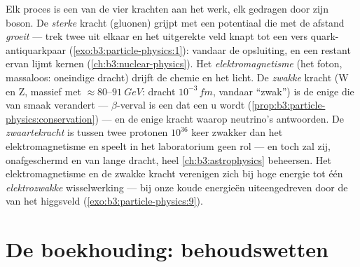 \begin{remark}\label{rem:b3:particle-physics:forces}
Elk proces is een van de vier krachten aan het werk, elk gedragen door zijn
boson. De \emph{sterke} kracht (gluonen) grijpt  met een
potentiaal die met de afstand \emph{groeit} --- trek twee 
uit elkaar en het uitgerekte veld knapt tot een vers
quark-antiquarkpaar (\cref{exo:b3:particle-physics:1}): vandaar
de opsluiting, en een restant ervan lijmt kernen
(\cref{ch:b3:nuclear-physics}). Het \emph{elektromagnetisme} (het foton,
massaloos: oneindige dracht) drijft de chemie en het licht. De
\emph{zwakke} kracht (W en Z, massief met
$\approx80$--$\qty{91}{GeV}$: dracht $10^{-3}\,\unit{fm}$,
vandaar ``zwak'') is de enige die van smaak verandert --- $\beta$-verval is
een  dat een u wordt
(\cref{prop:b3:particle-physics:conservation}) --- en de enige
kracht waarop neutrino's antwoorden. De \emph{zwaartekracht} is tussen twee protonen
$10^{36}$ keer zwakker dan het elektromagnetisme en speelt in het laboratorium
geen rol --- en toch zal zij, onafgeschermd en van lange dracht,
heel \cref{ch:b3:astrophysics} beheersen. Het elektromagnetisme en de zwakke
kracht verenigen zich bij hoge energie tot één \emph{elektrozwakke}
wisselwerking --- bij onze koude energieën uiteengedreven door de
 van het higgsveld (\cref{exo:b3:particle-physics:9}).
\end{remark}

\section{De boekhouding: behoudswetten}


